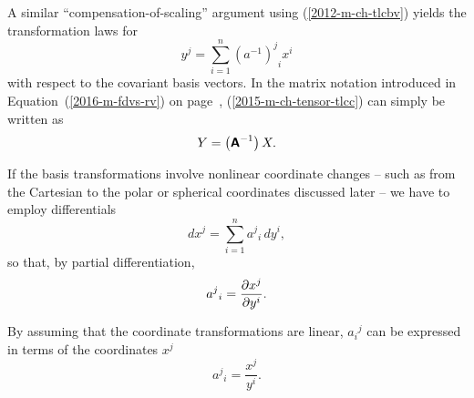 A similar ``compensation-of-scaling'' argument using
(\ref{2012-m-ch-tlcbv})
yields the transformation laws for
\begin{equation}
{ y }^j   = \sum_{i=1}^n {(a^{-1})^j}_i {x}^i
\label{2015-m-ch-tensor-tlcc}
\end{equation}
with respect to the covariant basis vectors.
In the matrix notation introduced in Equation~(\ref{2016-m-fdvs-rv}) on page~\pageref{2016-m-fdvs-rv},
(\ref{2015-m-ch-tensor-tlcc}) can simply be written as
\begin{equation}
 Y    =  \left(\textsf{\textbf{A}}^{-1}\right) X.
\label{2016-m-ch-di-tlcc-mn}
\end{equation}


If the basis transformations involve nonlinear coordinate changes -- such as from the
Cartesian to the polar or spherical coordinates discussed later -- we have to employ differentials
\begin{equation}
dx^j   = \sum_{i=1}^n {a^j}_i \,d{ y }^i  ,
\label{2012-m-ch-di-choic11}
\end{equation}
so that, by partial differentiation,
\begin{equation}
{a^j}_i ={\partial x^j \over \partial  y ^i}   .
\label{2001-mu-tensor-tl11}
\end{equation}

By assuming that the coordinate transformations are linear, ${a_i}^j$ can be expressed in terms of the coordinates $x^j$
\begin{equation}
{a^j}_i =\frac{  x^j }{   y ^i}  .
\label{2001-mu-tensor-tl1}
\end{equation}


